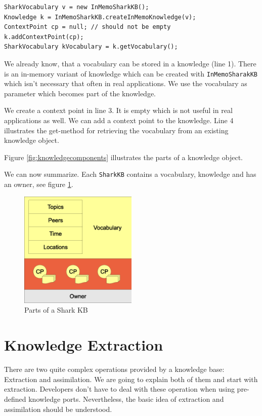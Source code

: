 \begin{verbatim}
SharkVocabulary v = new InMemoSharkKB();
Knowledge k = InMemoSharkKB.createInMemoKnowledge(v);
ContextPoint cp = null; // should not be empty
k.addContextPoint(cp);
SharkVocabulary kVocabulary = k.getVocabulary();
\end{verbatim}

We already know, that a vocabulary can be stored in a knowledge (line 1). There is an in-memory variant of knowledge which can be created with {\tt InMemoSharakKB} which isn't necessary that often in real applications. We use the vocabulary as parameter which becomes part of the knowledge.

We create a context point in line 3. It is empty which is not useful in real applications as well. We can add a context point to the knowledge. Line 4 illustrates the get-method for retrieving the vocabulary from an existing knowledge object.

Figure \ref{fig:knowledgecomponents} illustrates the parts of a knowledge object.


We can now summarize. Each {\tt SharkKB} contains a vocabulary, knowledge and has an owner, see figure \ref{fig:sharkkbcontent}.

\begin{figure}[t]
\centering
\includegraphics[width=0.50\textwidth]{sharkkbcontent.eps}
\caption{Parts of a Shark KB}
\label{fig:sharkkbcontent}
\end{figure}

\section{Knowledge Extraction}
\label{sec:extraction}
There are two quite complex operations provided by a knowledge base: Extraction and assimilation. We are going to explain both of them and start with extraction. Developers don't have to deal with these operation when using pre-defined knowledge ports. Nevertheless, the basic idea of extraction and assimilation should be understood.

